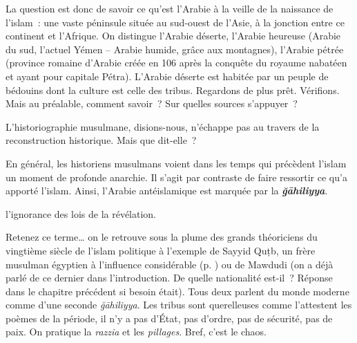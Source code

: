 La question est donc de savoir ce qu'est l'Arabie à la veille de la
naissance de l'islam~: une vaste péninsule située au sud-ouest de
l'Asie, à la jonction entre ce continent et l'Afrique. On distingue
l'Arabie déserte, l'Arabie heureuse (Arabie du sud, l'actuel Yémen --
Arabie humide, grâce aux montagnes), l'Arabie pétrée (province romaine
d'Arabie créée en 106 après la conquête du royaume nabatéen et ayant
pour capitale Pétra). L'Arabie déserte est habitée par un peuple de
bédouins dont la culture est celle des tribus. Regardons de plus prêt.
Vérifions. Mais au préalable, comment savoir~? Sur quelles sources
s'appuyer~?


L'historiographie musulmane, disions-nous, n'échappe pas au travers de
la reconstruction historique. Mais que dit-elle~?


En général, les historiens musulmans voient dans les temps qui précèdent
l'islam un moment de profonde anarchie. Il s'agit par contraste de faire
ressortir ce qu'a apporté l'islam. Ainsi, l'Arabie antéislamique est
marquée par la \emph{\textbf{ğāhiliyya}}.
\begin{Def}
l'ignorance des
lois de la révélation. 
\end{Def}
Retenez ce terme\ldots{} on le retrouve sous la
plume des grands théoriciens du vingtième siècle de l'islam politique à
l'exemple de Sayyid Quṭb, un frère musulman égyptien à l'influence
considérable (p. \pageref{theol:SayyidQu}) ou de Mawdudi (on a déjà parlé de ce dernier dans
l'introduction. De quelle nationalité est-il~? Réponse dans le chapitre
précédent si besoin était). Tous deux parlent du monde moderne comme
d'une seconde \emph{ğāhiliyya}. Les tribus sont querelleuses comme l'attestent les poèmes de la période, il n'y a pas d'État, pas d'ordre,
pas de sécurité, pas de paix. On pratique la \emph{razzia} et les
\emph{pillages}. Bref, c'est le chaos.

